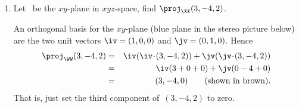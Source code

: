 \begin{example} \label{eg:orthproj}
\begin{enumerate}
\item Let \XX\ be the \(xy\)-plane in \(xyz\)-space, find \(\proj_\XX(3,-4,2)\).
\begin{solution} 
An orthogonal basis for the \(xy\)-plane (blue plane in the stereo picture below) are the two unit vectors \(\iv=(1,0,0)\) and \(\jv=(0,1,0)\). Hence
\begin{eqnarray*}
\proj_\WW(3,-4,2)
&=&\iv(\iv\cdot(3,-4,2))+\jv(\jv\cdot(3,-4,2))
\\&=&\iv (3+0+0)+\jv (0-4+0) 
\\&=&(3,-4,0)
\qquad(\text{shown in brown}).
\end{eqnarray*}
That is, just set the third component of~\((3,-4,2)\) to zero.
\begin{center}
\end{center}
\end{solution}


\end{enumerate}
\end{example}

